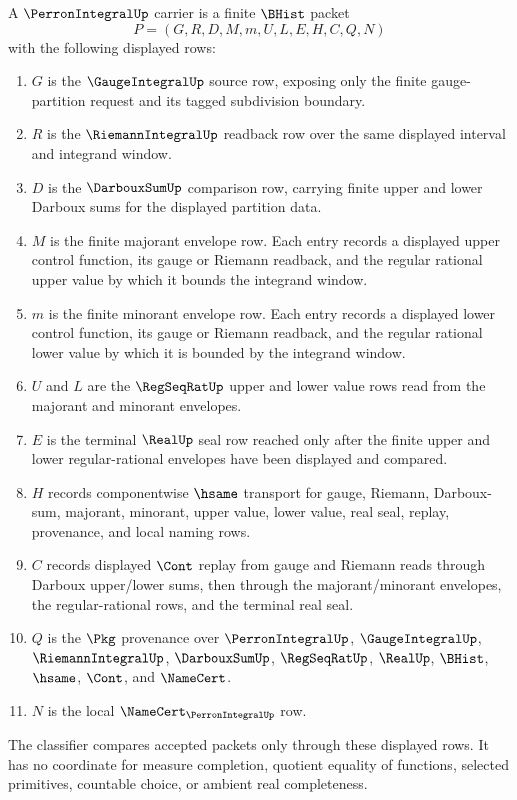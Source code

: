 \begin{definition}
\label{def:perron-integral-carrier}
A $\PerronIntegralUp$ carrier is a finite $\BHist$ packet
$$
P=(G,R,D,M,m,U,L,E,H,C,Q,N)
$$
with the following displayed rows:
\begin{enumerate}
\item $G$ is the $\GaugeIntegralUp$ source row, exposing only the finite gauge-partition request and its tagged subdivision boundary.
\item $R$ is the $\RiemannIntegralUp$ readback row over the same displayed interval and integrand window.
\item $D$ is the $\DarbouxSumUp$ comparison row, carrying finite upper and lower Darboux sums for the displayed partition data.
\item $M$ is the finite majorant envelope row. Each entry records a displayed upper control function, its gauge or Riemann readback, and the regular rational upper value by which it bounds the integrand window.
\item $m$ is the finite minorant envelope row. Each entry records a displayed lower control function, its gauge or Riemann readback, and the regular rational lower value by which it is bounded by the integrand window.
\item $U$ and $L$ are the $\RegSeqRatUp$ upper and lower value rows read from the majorant and minorant envelopes.
\item $E$ is the terminal $\RealUp$ seal row reached only after the finite upper and lower regular-rational envelopes have been displayed and compared.
\item $H$ records componentwise $\hsame$ transport for gauge, Riemann, Darboux-sum, majorant, minorant, upper value, lower value, real seal, replay, provenance, and local naming rows.
\item $C$ records displayed $\Cont$ replay from gauge and Riemann reads through Darboux upper/lower sums, then through the majorant/minorant envelopes, the regular-rational rows, and the terminal real seal.
\item $Q$ is the $\Pkg$ provenance over $\PerronIntegralUp$, $\GaugeIntegralUp$, $\RiemannIntegralUp$, $\DarbouxSumUp$, $\RegSeqRatUp$, $\RealUp$, $\BHist$, $\hsame$, $\Cont$, and $\NameCert$.
\item $N$ is the local $\NameCert_{\PerronIntegralUp}$ row.
\end{enumerate}
The classifier compares accepted packets only through these displayed rows. It has no coordinate for measure completion, quotient equality of functions, selected primitives, countable choice, or ambient real completeness.
\end{definition}

